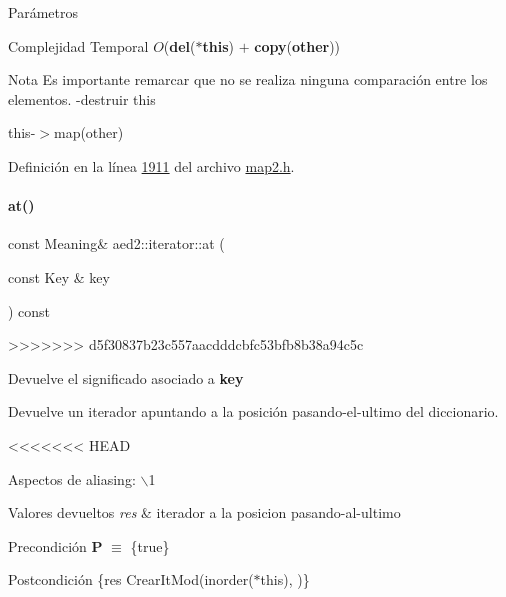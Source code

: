 \begin{DoxyParams}{\-Parámetros}
\begin{DoxyDescription}
\item[Complejidad Temporal]$O$({\bfseries del}({\bfseries $\ast$this}) $+$ {\bfseries copy}({\bfseries other}))
\end{DoxyDescription}

\begin{DoxyNote}{Nota}
Es importante remarcar que no se realiza ninguna comparación entre los elementos. -\/destruir this
\begin{DoxyItemize}
\item this-\/$>$map(other) 
\end{DoxyItemize}
\end{DoxyNote}


Definición en la línea \hyperlink{map2_8h_source_l01911}{1911} del archivo \hyperlink{map2_8h_source}{map2.\+h}.

\mbox{\label{classaed2_1_1iterator_a5a443b1a5d288b9512a6698b92cb415d_a5a443b1a5d288b9512a6698b92cb415d}} 
\paragraph{\texorpdfstring{at()}{at()}\hspace{0.1cm}{\footnotesize\ttfamily [1/2]}}
{\footnotesize\ttfamily const Meaning\& aed2\+::iterator\+::at (\begin{DoxyParamCaption}\item[{const Key \&}]{key }\end{DoxyParamCaption}) const\hspace{0.3cm}{\ttfamily [inline]}}


>>>>>>> d5f30837b23c557aacdddcbfc53bfb8b38a94c5c

Devuelve el significado asociado a {\bfseries key} 

\-Devuelve un iterador apuntando a la posición pasando-\/el-\/ultimo del diccionario. 

<<<<<<< HEAD
\begin{DoxyParagraph}{\-Aspectos de aliasing\-:}
$\backslash$1
\end{DoxyParagraph}

\begin{DoxyRetVals}{\-Valores devueltos}
{\em res} & iterador a la posicion pasando-\/al-\/ultimo\\
\hline
\end{DoxyRetVals}
\begin{DoxyPrecond}{\-Precondición}
{\bfseries \-P} $\equiv$ \{true\} 
\end{DoxyPrecond}
\begin{DoxyPostcond}{\-Postcondición}
\{res  \-Crear\-It\-Mod(inorder($\ast$this),  )\}
\end{DoxyPostcond}


\end{DoxyParams}
